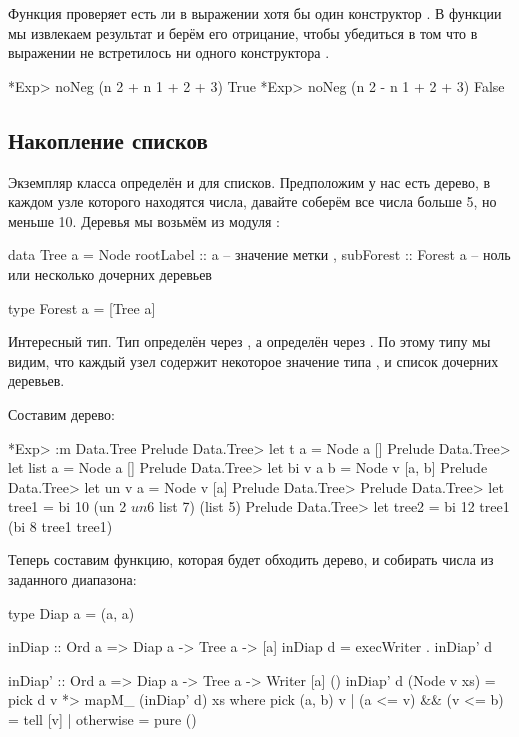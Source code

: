 Функция  проверяет есть ли в выражении хотя бы один
конструктор . В функции  мы извлекаем результат и
берём его отрицание, чтобы убедиться в том что в выражении не
встретилось ни одного конструктора .


\begin{code}
*Exp> noNeg (n 2 + n 1 + 2 + 3)
True
*Exp> noNeg (n 2 - n 1 + 2 + 3)
False
\end{code}

\subsection{Накопление списков}

Экземпляр класса  определён и для списков. Предположим у нас
есть дерево, в каждом узле которого находятся числа, давайте соберём все
числа больше 5, но меньше 10. Деревья мы возьмём из модуля
:


\begin{code}
data Tree a   = Node 
        { rootLabel :: a           -- значение метки
        , subForest :: Forest a    -- ноль или несколько дочерних деревьев
        }

type Forest a = [Tree a]
\end{code}

Интересный тип. Тип  определён через , а 
определён через . По этому типу мы видим, что каждый узел
содержит некоторое значение типа , и список дочерних деревьев.

Составим дерево:


\begin{code}
*Exp> :m Data.Tree
Prelude Data.Tree> let t a = Node a []
Prelude Data.Tree> let list a = Node a []
Prelude Data.Tree> let bi v a b = Node v [a, b]
Prelude Data.Tree> let un v a   = Node v [a]
Prelude Data.Tree> 
Prelude Data.Tree> let tree1 = bi 10 (un 2 $ un 6 $ list 7) (list 5)
Prelude Data.Tree> let tree2 = bi 12 tree1 (bi 8 tree1 tree1)
\end{code}

Теперь составим функцию, которая будет обходить дерево, и собирать числа
из заданного диапазона:


\begin{code}
type Diap a = (a, a)

inDiap :: Ord a => Diap a -> Tree a -> [a]
inDiap d = execWriter . inDiap' d

inDiap' :: Ord a => Diap a -> Tree a -> Writer [a] ()
inDiap' d (Node v xs) = pick d v *> mapM_ (inDiap' d) xs 
    where pick (a, b) v
            | (a <= v) && (v <= b)  = tell [v]
            | otherwise             = pure ()
\end{code}

